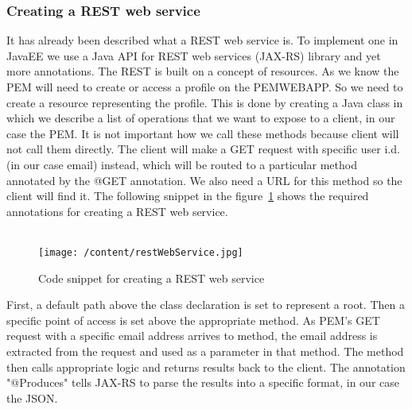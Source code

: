 \documentclass[12pt, a4paper]{report}   %
\begin{document}
\begin{enumerate}
\subsubsection{Creating a REST web service}
It has already been described what a REST web service is. To implement one in JavaEE we use a Java API for REST web services (JAX-RS) library and yet more annotations. The REST is built on a concept of resources. As we know the PEM will need to create or access a profile on the PEMWEBAPP. So we need to create a resource representing the profile. This is done by creating a Java class in which we describe a list of operations that we want to expose to a client, in our case the PEM. It is not important how we call these methods because client will not call them directly. The client will make a GET request with specific user i.d. (in our case email) instead, which will be routed to a particular method annotated by the @GET annotation. We also need a URL for this method so the client will find it. The following snippet in the figure~\ref{restWebService} shows the required annotations for creating a REST web service.\\ \\


\begin{figure}[H]
  \centering
	\texttt{[image: /content/restWebService.jpg]}
	  \caption{Code snippet for creating a REST web service}
	  \label{restWebService}
\end{figure}


First, a default path above the class declaration is set to represent a root. Then a specific point of access is set above the appropriate method. As PEM's GET request with a specific email address arrives to method, the email address is extracted from the request and used as a parameter in that method. The method then calls appropriate logic and returns results back to the client. The annotation "$@$Produces" tells JAX-RS to parse the results into a specific format, in our case the JSON.


\end{enumerate}
\end{document}
